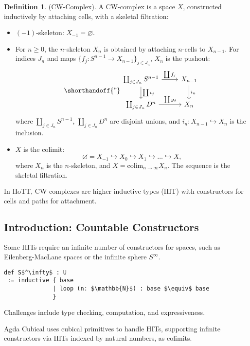 \documentclass{article}
\theoremstyle{definition}
\newtheorem{definition}{Definition}
\newcommand*{\incmap}{\hookrightarrow}
\begin{document}
\begin{definition} (CW-Complex).
A CW-complex is a space \( X \), constructed inductively by attaching cells, with a skeletal filtration:
\begin{itemize}
    \item \((-1)\)-skeleton: \( X_{-1} = \varnothing \).
    \item For \( n \geq 0 \), the $n$-skeleton \( X_n \) is obtained by attaching $n$-cells to \( X_{n-1} \). For
      indices \( J_n \) and maps \( \{ f_j : S^{n-1} \to X_{n-1}
      \}_{j \in J_n} \), \( X_n \) is the pushout:
    \[
    \shorthandoff{"}
    \begin{tikzcd}
    \coprod_{j \in J_n} S^{n-1} \arrow[r, "\coprod f_j"] \arrow[d, "\coprod \iota_j"] & X_{n-1} \arrow[d, "i_n"] \\
    \coprod_{j \in J_n} D^n \arrow[r, "\coprod g_j"] & X_n
    \end{tikzcd}
    \]
    where \( \coprod_{j \in J_n} S^{n-1} \), \( \coprod_{j \in
    J_n} D^n \) are disjoint unions, and \( i_n : X_{n-1}
    \incmap X_n \) is the inclusion.
    \item \( X \) is the colimit:
    \[
    \varnothing = X_{-1} \incmap X_0 \incmap X_1 \incmap \dots
    \incmap X,
    \]
    where \( X_n \) is the $n$-skeleton, and \( X = \text{colim}_{n
    \to \infty} X_n \). The sequence is the skeletal filtration.
\end{itemize}
In HoTT, CW-complexes are higher inductive types (HIT)
with constructors for cells and paths for attachment.
\end{definition}

\newpage
\subsection{Introduction: Countable Constructors}
Some HITs require an infinite number of constructors for spaces,
such as Eilenberg-MacLane spaces or the infinite sphere \( S^\infty \).
\begin{lstlisting}[mathescape=true]
def S$^\infty$ : U
 := inductive { base
              | loop (n: $\mathbb{N}$) : base $\equiv$ base
              }
\end{lstlisting}
Challenges include type checking, computation, and expressiveness.

Agda Cubical uses cubical primitives to handle HITs, supporting
infinite constructors via HITs indexed by natural numbers, as colimits.
\end{document}
